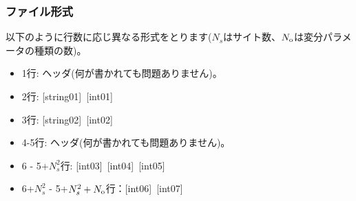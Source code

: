 \subsubsection{ファイル形式}
以下のように行数に応じ異なる形式をとります($N_s$はサイト数、$N_{\rm o}$は変分パラメータの種類の数)。
 \begin{itemize}
   \item  1行:  ヘッダ(何が書かれても問題ありません)。
   \item  2行:   [string01]~[int01]
   \item  3行:   [string02]~[int02]
   \item  4-5行:  ヘッダ(何が書かれても問題ありません)。
   \item  6 - 5+$N_s^2$行: [int03]~[int04]~[int05]
   \item  6+$N_s^2$ - 5+$N_s^2+N_{\rm o}$行：[int06]~[int07]
  \end{itemize}
